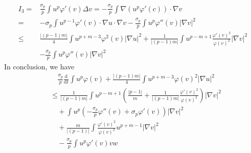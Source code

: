 \documentclass[12pt,]{article}
\begin{document}
\begin{equation}
  \begin{aligned}
    I_3=&\frac{\sigma_{p}}{p}\int u^p\varphi'(v)\Delta v = -\frac{\sigma_{p}}{p}\int \nabla(u^p\varphi'(c))\cdot\nabla v\\
    =&-\sigma_{p}\int u^{p-1}\varphi'(v)\cdot \nabla u\cdot\nabla v -\frac{\sigma_{p}}{p} \int u^p\varphi''(v)|\nabla v|^2\\
    \leqslant & \frac{|(p-1)m|}{4}\int u^{p+m-3}\varphi^2(v)|\nabla u |^{2}+\frac{1}{|(p-1)m|}\int u^{p-m+1}\frac{\varphi'(v)^2}{\varphi(v)^2}|\nabla v|^2\\
    &-\frac{\sigma_{p}}{p} \int u^p\varphi''(v)|\nabla v|^2
  \end{aligned}
\end{equation}
In conclusion, we have
\begin{equation}
  \begin{aligned}
    &\quad\frac{\sigma_{p}}{p}\frac{\mathrm{d}}{\mathrm{d} t} \int u^{p} \varphi(v) +  \frac{|(p-1)m|}{4}\int u^{p+m-3}\varphi(v)^2|\nabla u| ^2 \\
    &\leqslant \frac{1}{|(p-1)m|}\int u^{p-m+1}\left(\frac{|p-1|}{m}+\frac{1}{|(p-1)m|}\frac{\varphi'(v)^2}{\varphi(v)^2}\right)|\nabla v|^2\\
    &\quad + \int u^p\left(-\frac{\sigma_{p}}{p}\varphi''(v)+\sigma_{p}\varphi'(v)\right)|\nabla v|^2\\
    &\quad +\frac{m}{|(p-1)|}\int \frac{\varphi'(v)^2}{\varphi(v)^2}u^{p+m-1}|\nabla v|^2\\
    &\quad - \frac{\sigma_{p}}{p}\int u^p\varphi'(v)vw
  \end{aligned}
\end{equation}



% 
\end{document}
